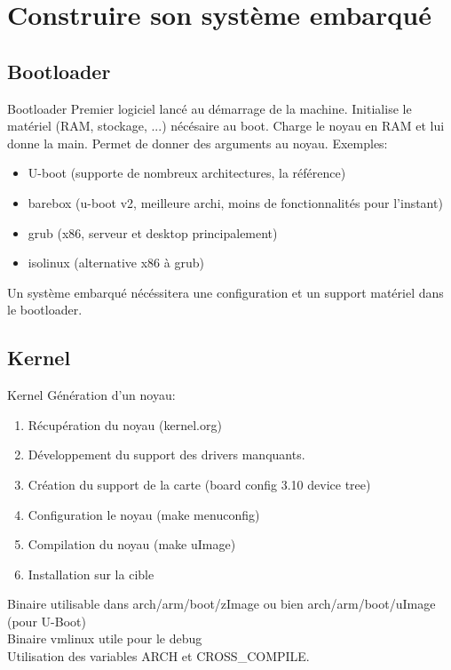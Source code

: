 \section{Construire son système embarqué}

\subsection{Bootloader}
\begin{frame}{Bootloader}{}
	Premier logiciel lancé au démarrage de la machine.
	Initialise le matériel (RAM, stockage, ...) nécésaire au boot.
	Charge le noyau en RAM et lui donne la main.
	Permet de donner des arguments au noyau.
	Exemples:
	\begin{itemize}
		\item
			U-boot (supporte de nombreux architectures, la référence)
		\item
			barebox (u-boot v2, meilleure archi, moins de fonctionnalités pour l'instant)
		\item
			grub (x86, serveur et desktop principalement)
		\item
			isolinux (alternative x86 à grub)
	\end{itemize}
	Un système embarqué nécéssitera une configuration et un support matériel dans le bootloader.
\end{frame}

\subsection{Kernel}
\begin{frame}{Kernel}{}
	Génération d'un noyau:
	\begin{enumerate}
		\item
			Récupération du noyau (kernel.org)
		\item
			Développement du support des drivers manquants.
		\item
			Création du support de la carte (board config  3.10  device tree)
		\item
			Configuration le noyau (make menuconfig)
		\item
			Compilation du noyau (make uImage)
		\item
			Installation sur la cible
	\end{enumerate}
	Binaire utilisable dans arch/arm/boot/zImage ou bien arch/arm/boot/uImage (pour U-Boot)\\
	Binaire vmlinux utile pour le debug\\
	Utilisation des variables ARCH et CROSS\_COMPILE.
\end{frame}


